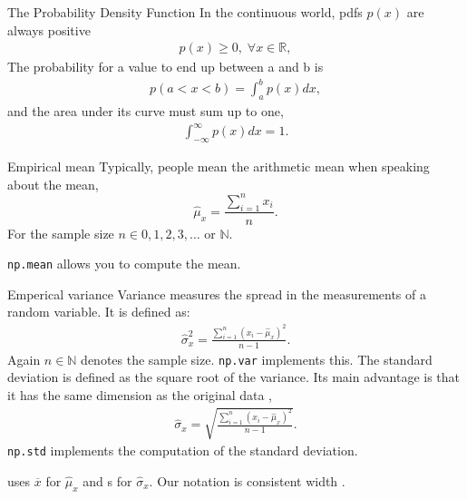 \documentclass{beamer}
\begin{document}
    \begin{frame}{The Probability Density Function}
      In the continuous world, pdfs $p(x)$ are always positive
      \begin{align}
        p(x) \geq 0, \; \forall x \in \mathbb{R},
      \end{align}
      The probability for a value to end up between a and b is
      \begin{align}
        p(a < x < b) = \int_{a}^{b} p(x) dx,
      \end{align}
      and the area under its curve must sum up to one,
      \begin{align}
        \int_{-\infty}^{\infty} p(x) dx = 1.
      \end{align}

    \end{frame}


    \begin{frame}{Empirical mean}
      Typically, people mean the arithmetic mean when speaking about the mean,
      \begin{equation}
        \hat{\mu}_x = \frac{\sum_{i=1}^{n} x_i}{n} .
      \end{equation}
      For the sample size $n \in {0,1,2,3,\dots}$ or $\mathbb{N}$.

      \texttt{np.mean} allows you to compute the mean.
    \end{frame}


    \begin{frame}{Emperical variance}
      Variance measures the spread in the measurements of a random variable.
      It is defined as:
      \begin{align}
        \hat{\sigma}_x^2 = \frac{\sum_{i=1}^{n}(x_i - \hat{\mu}_x)^2}{n-1}.
      \end{align}
      Again $n \in \mathbb{N}$ denotes the sample size.
      \texttt{np.var} implements this.
      The standard deviation is defined as the square root of the variance.
      Its main advantage is that it has the same dimension as the original data \cite{haslwanter2016introduction},
      \begin{align}
        \hat{\sigma}_x = \sqrt{\frac{\sum_{i=1}^{n}(x_i - \hat{\mu}_x)^2}{n-1}}.
      \end{align}
      \texttt{np.std} implements the computation of the standard deviation.
      
      \cite{haslwanter2016introduction} uses $\overline{x}$ for $\hat{\mu}_x$ and 
      s for $\hat{\sigma}_x$. Our notation is consistent width \cite{mcnicholas2016mixture}.
    \end{frame}
\end{document}
